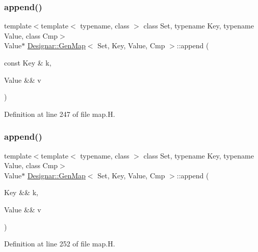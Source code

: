 \subsubsection{\texorpdfstring{append()}{append()}\hspace{0.1cm}{\footnotesize\ttfamily [3/4]}}
{\footnotesize\ttfamily template$<$template$<$ typename, class $>$ class Set, typename Key, typename Value, class Cmp$>$ \\
Value$\ast$ \hyperlink{class_designar_1_1_gen_map}{Designar\+::\+Gen\+Map}$<$ Set, Key, Value, Cmp $>$\+::append (\begin{DoxyParamCaption}\item[{const Key \&}]{k,  }\item[{Value \&\&}]{v }\end{DoxyParamCaption})\hspace{0.3cm}{\ttfamily [inline]}}



Definition at line 247 of file map.\+H.

\mbox{\label{class_designar_1_1_gen_map_a3bb1fd57e4ff94c0e585b41a359d0c52}} 
\subsubsection{\texorpdfstring{append()}{append()}\hspace{0.1cm}{\footnotesize\ttfamily [4/4]}}
{\footnotesize\ttfamily template$<$template$<$ typename, class $>$ class Set, typename Key, typename Value, class Cmp$>$ \\
Value$\ast$ \hyperlink{class_designar_1_1_gen_map}{Designar\+::\+Gen\+Map}$<$ Set, Key, Value, Cmp $>$\+::append (\begin{DoxyParamCaption}\item[{Key \&\&}]{k,  }\item[{Value \&\&}]{v }\end{DoxyParamCaption})\hspace{0.3cm}{\ttfamily [inline]}}



Definition at line 252 of file map.\+H.

\mbox{\label{class_designar_1_1_gen_map_ad768d9e00839f4d328a1394ffc806d83}} 
